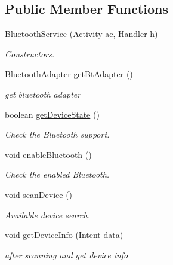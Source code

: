 \subsection*{Public Member Functions}
\begin{DoxyCompactItemize}
\item 
\mbox{\hyperlink{classhi_1_1world_1_1hello_1_1myapplication_1_1_bluetooth_service_a2c0b1d538e621bd607a6f90fd4f436a8}{Bluetooth\+Service}} (Activity ac, Handler h)
\begin{DoxyCompactList}\small\item\em Constructors. \end{DoxyCompactList}\item 
Bluetooth\+Adapter \mbox{\hyperlink{classhi_1_1world_1_1hello_1_1myapplication_1_1_bluetooth_service_a13b9759e4ae34055ed5a971c9d897a1e}{get\+Bt\+Adapter}} ()
\begin{DoxyCompactList}\small\item\em get bluetooth adapter \end{DoxyCompactList}\item 
boolean \mbox{\hyperlink{classhi_1_1world_1_1hello_1_1myapplication_1_1_bluetooth_service_a95cebd7d24a50c4ac215e2f364647138}{get\+Device\+State}} ()
\begin{DoxyCompactList}\small\item\em Check the Bluetooth support. \end{DoxyCompactList}\item 
void \mbox{\hyperlink{classhi_1_1world_1_1hello_1_1myapplication_1_1_bluetooth_service_a8420e00ed0378799eeae86fde8cf9ff3}{enable\+Bluetooth}} ()
\begin{DoxyCompactList}\small\item\em Check the enabled Bluetooth. \end{DoxyCompactList}\item 
void \mbox{\hyperlink{classhi_1_1world_1_1hello_1_1myapplication_1_1_bluetooth_service_a61f42dfb0258017463ecbb947d5c7217}{scan\+Device}} ()
\begin{DoxyCompactList}\small\item\em Available device search. \end{DoxyCompactList}\item 
void \mbox{\hyperlink{classhi_1_1world_1_1hello_1_1myapplication_1_1_bluetooth_service_a8d6db94de0f1a864a775d1e93f796bab}{get\+Device\+Info}} (Intent data)
\begin{DoxyCompactList}\small\item\em after scanning and get device info \end{DoxyCompactList}\item 

\end{DoxyCompactItemize}
